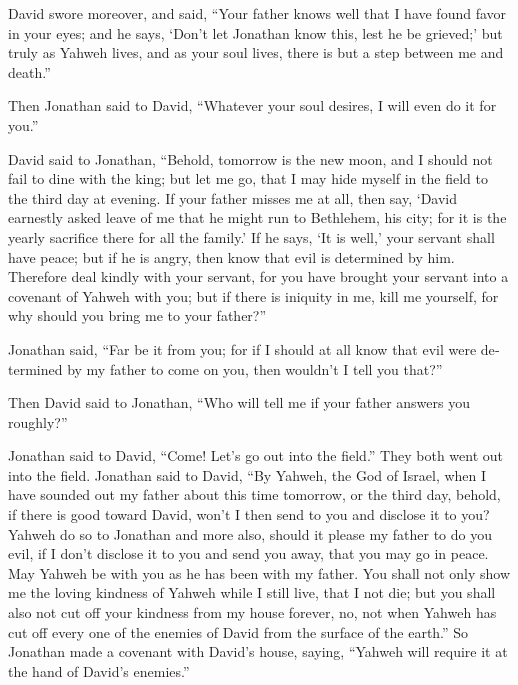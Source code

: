 \begin{paracol}{2}
\begin{otherlanguage}{english}
 David swore moreover, and said, ``Your father knows well
that I have found favor in your eyes; and he says, `Don't let Jonathan
know this, lest he be grieved;' but truly as Yahweh lives, and as your
soul lives, there is but a step between me and death.''

 Then Jonathan said to David, ``Whatever your soul
desires, I will even do it for you.''

 David said to Jonathan, ``Behold, tomorrow is the new
moon, and I should not fail to dine with the king; but let me go, that I
may hide myself in the field to the third day at evening. 
If your father misses me at all, then say, `David earnestly asked leave
of me that he might run to Bethlehem, his city; for it is the yearly
sacrifice there for all the family.'  If he says, `It is
well,' your servant shall have peace; but if he is angry, then know that
evil is determined by him.  Therefore deal kindly with
your servant, for you have brought your servant into a covenant of
Yahweh with you; but if there is iniquity in me, kill me yourself, for
why should you bring me to your father?''

 Jonathan said, ``Far be it from you; for if I should at
all know that evil were determined by my father to come on you, then
wouldn't I tell you that?''

 Then David said to Jonathan, ``Who will tell me if your
father answers you roughly?''

 Jonathan said to David, ``Come! Let's go out into the
field.'' They both went out into the field.  Jonathan
said to David, ``By Yahweh, the God of Israel, when I have sounded out
my father about this time tomorrow, or the third day, behold, if there
is good toward David, won't I then send to you and disclose it to you?
 Yahweh do so to Jonathan and more also, should it please
my father to do you evil, if I don't disclose it to you and send you
away, that you may go in peace. May Yahweh be with you as he has been
with my father.  You shall not only show me the loving
kindness of Yahweh while I still live, that I not die; 
but you shall also not cut off your kindness from my house forever, no,
not when Yahweh has cut off every one of the enemies of David from the
surface of the earth.''  So Jonathan made a covenant with
David's house, saying, ``Yahweh will require it at the hand of David's
enemies.''


\end{otherlanguage}
\end{paracol}
